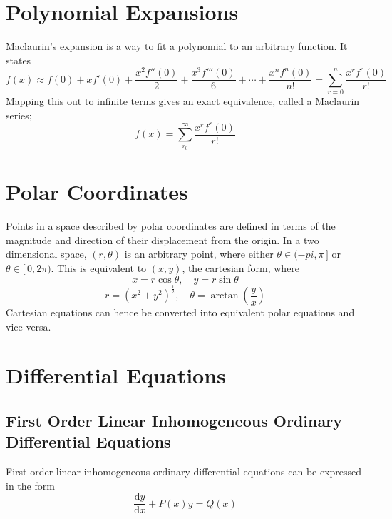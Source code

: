 \documentclass{article}
\newcommand{\de}{\textrm{d}}
\begin{document}
\section{Polynomial Expansions}

Maclaurin's expansion is a way to fit a polynomial to an arbitrary function. It
states \[f(x) \approx f(0) + xf'(0) + \frac{x^2f''(0)}{2} +
    \frac{x^3f'''(0)}{6} + \cdots + \frac{x^nf^n(0)}{n!} = \sum_{r=0}^{n}
\frac{x^rf^r(0)}{r!}\] Mapping this out to infinite terms gives an exact
equivalence, called a Maclaurin series; \[f(x) = \sum_{r_0}^{\infty}
\frac{x^rf^r(0)}{r!}\]

\section{Polar Coordinates}

\begin{multicols}{2}

    \begin{center}


    \end{center}

    \noindent Points in a space described by polar coordinates are defined in
    terms of the magnitude and direction of their displacement from the origin.
    In a two dimensional space, \(\left( r, \theta \right)\) is an arbitrary
    point, where either \(\theta \in (-pi, \pi \,]\) or \(\theta \in [\, 0, 2
    \pi)\). This is equivalent to \((x, y)\), the cartesian form, where \[x = r
    \cos \theta, \quad y = r \sin \theta\] \[r = \left( x^2 + y^2
        \right)^{\frac{1}{2}}, \quad \theta = \arctan \left( \frac{y}{x}
    \right)\] Cartesian equations can hence be converted into equivalent polar
    equations and vice versa. 

\end{multicols}

\section{Differential Equations}

\subsection{First Order Linear Inhomogeneous Ordinary Differential Equations}

First order linear inhomogeneous ordinary differential equations can be
expressed in the form \[\frac{\de y}{\de x} + P(x)y = Q(x)\]
\end{document}
